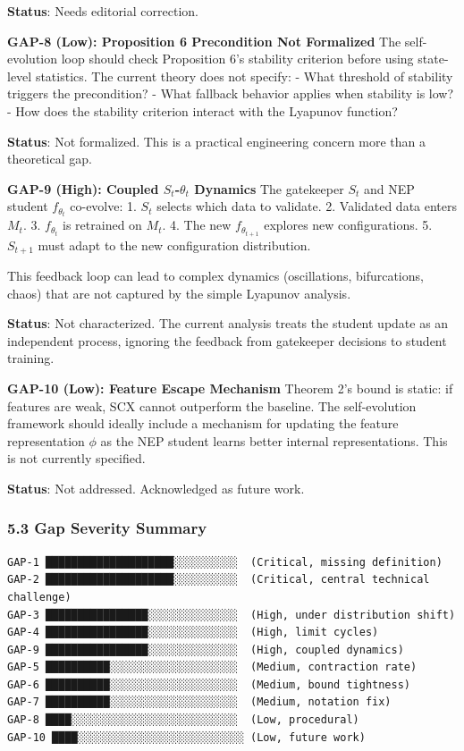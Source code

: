 \documentclass[
  12pt,
]{article}
\begin{document}
\textbf{Status}: Needs editorial correction.

\textbf{GAP-8 (Low): Proposition 6 Precondition Not Formalized} The
self-evolution loop should check Proposition 6's stability criterion
before using state-level statistics. The current theory does not
specify: - What threshold of stability triggers the precondition? - What
fallback behavior applies when stability is low? - How does the
stability criterion interact with the Lyapunov function?

\textbf{Status}: Not formalized. This is a practical engineering concern
more than a theoretical gap.

\textbf{GAP-9 (High): Coupled \(S_t\)-\(\theta_t\) Dynamics} The
gatekeeper \(S_t\) and NEP student \(f_{\theta_t}\) co-evolve: 1.
\(S_t\) selects which data to validate. 2. Validated data enters
\(M_t\). 3. \(f_{\theta_t}\) is retrained on \(M_t\). 4. The new
\(f_{\theta_{t+1}}\) explores new configurations. 5. \(S_{t+1}\) must
adapt to the new configuration distribution.

This feedback loop can lead to complex dynamics (oscillations,
bifurcations, chaos) that are not captured by the simple Lyapunov
analysis.

\textbf{Status}: Not characterized. The current analysis treats the
student update as an independent process, ignoring the feedback from
gatekeeper decisions to student training.

\textbf{GAP-10 (Low): Feature Escape Mechanism} Theorem 2's bound is
static: if features are weak, SCX cannot outperform the baseline. The
self-evolution framework should ideally include a mechanism for updating
the feature representation \(\phi\) as the NEP student learns better
internal representations. This is not currently specified.

\textbf{Status}: Not addressed. Acknowledged as future work.

\subsubsection{5.3 Gap Severity Summary}\label{gap-severity-summary}

\begin{verbatim}
GAP-1 ████████████████████░░░░░░░░░░  (Critical, missing definition)
GAP-2 ████████████████████░░░░░░░░░░  (Critical, central technical challenge)
GAP-3 ████████████████░░░░░░░░░░░░░░  (High, under distribution shift)
GAP-4 ████████████████░░░░░░░░░░░░░░  (High, limit cycles)
GAP-9 ████████████████░░░░░░░░░░░░░░  (High, coupled dynamics)
GAP-5 ██████████░░░░░░░░░░░░░░░░░░░░  (Medium, contraction rate)
GAP-6 ██████████░░░░░░░░░░░░░░░░░░░░  (Medium, bound tightness)
GAP-7 ██████████░░░░░░░░░░░░░░░░░░░░  (Medium, notation fix)
GAP-8 ████░░░░░░░░░░░░░░░░░░░░░░░░░░  (Low, procedural)
GAP-10 ████░░░░░░░░░░░░░░░░░░░░░░░░░░ (Low, future work)
\end{verbatim}
\end{document}
